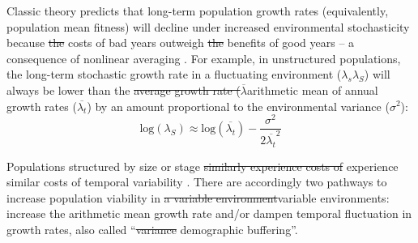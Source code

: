 \documentclass[lineno,sn-nature]{sn-jnl}%
\providecommand{\DIFadd}[1]{{\protect\color{blue}#1}} %
\providecommand{\DIFdel}[1]{{\protect\color{red}\protect\scriptsize\sout{#1}}}
\providecommand{\DIFadd}[1]{{\protect\color{blue}\uwave{#1}}} %
\providecommand{\DIFdel}[1]{{\protect\color{red}\sout{#1}}}                      %
\providecommand{\DIFaddbegin}{} %
\providecommand{\DIFaddend}{} %
\providecommand{\DIFdelbegin}{} %
\providecommand{\DIFdelend}{} %
\newcommand{\DIFscaledelfig}{0.5}
\newlength{\DIFdelgraphicswidth} %
\newlength{\DIFdelgraphicsheight} %
\newcommand{\DIFaddincludegraphics}[2][]{{\color{blue}\fbox{\DIFOincludegraphics[#1]{#2}}}} %
\newcommand{\DIFdelincludegraphics}[2][]{%
\sbox{\DIFdelgraphicsbox}{\DIFOincludegraphics[#1]{#2}}%
\settoboxwidth{\DIFdelgraphicswidth}{\DIFdelgraphicsbox} %
\settoboxtotalheight{\DIFdelgraphicsheight}{\DIFdelgraphicsbox} %
\scalebox{\DIFscaledelfig}{%
\parbox[b]{\DIFdelgraphicswidth}{\usebox{\DIFdelgraphicsbox}\\[-\baselineskip] \rule{\DIFdelgraphicswidth}{0em}}\llap{\resizebox{\DIFdelgraphicswidth}{\DIFdelgraphicsheight}{%
\setlength{\unitlength}{\DIFdelgraphicswidth}%
\begin{picture}(1,1)%
\thicklines\linethickness{2pt} %
{\color[rgb]{1,0,0}\put(0,0){\framebox(1,1){}}}%
{\color[rgb]{1,0,0}\put(0,0){\line( 1,1){1}}}%
{\color[rgb]{1,0,0}\put(0,1){\line(1,-1){1}}}%
\end{picture}%
}\hspace*{3pt}}} %
} %
\DeclareRobustCommand{\DIFaddbegin}{\DIFOaddbegin \let\includegraphics\DIFaddincludegraphics} %
\DeclareRobustCommand{\DIFaddend}{\DIFOaddend \let\includegraphics\DIFOincludegraphics} %
\DeclareRobustCommand{\DIFdelbegin}{\DIFOdelbegin \let\includegraphics\DIFdelincludegraphics} %
\DeclareRobustCommand{\DIFdelend}{\DIFOaddend \let\includegraphics\DIFOincludegraphics} %
\begin{document}
Classic theory predicts that long-term population growth rates (equivalently, population mean fitness) will decline under increased environmental stochasticity because \DIFdelbegin \DIFdel{the }\DIFdelend costs of bad years outweigh \DIFdelbegin \DIFdel{the }\DIFdelend benefits of good years -- a consequence of nonlinear averaging \cite{lewontin_population_1969,tuljapurkar_population_1982}.
For example, in unstructured populations, the long-term stochastic growth rate in a fluctuating environment (\DIFdelbegin \DIFdel{$\lambda_s$}\DIFdelend \DIFaddbegin \DIFadd{$\lambda_S$}\DIFaddend ) will always be lower than the \DIFdelbegin \DIFdel{average growth rate ($\overline{\lambda}$}\DIFdelend \DIFaddbegin \DIFadd{arithmetic mean of annual growth rates ($\overline{\lambda_{t}}$}\DIFaddend ) by an amount proportional to the environmental variance ($\sigma^2$): 
\DIFdelbegin %
\DIFdelend \DIFaddbegin \begin{equation}
\mbox{log}(\lambda_S)  \approx \mbox{log}(\overline{\lambda_{t}}) - \frac{\sigma^2}{2\overline{\lambda_{t}}^2}
\end{equation}

\DIFaddend 

\noindent Populations structured by size or stage \DIFdelbegin \DIFdel{similarly experience costs of }\DIFdelend \DIFaddbegin \DIFadd{experience similar costs of temporal }\DIFaddend variability \cite{cohen1979comparative, tuljapurkar2013population}.
There are accordingly two pathways to increase population viability in \DIFdelbegin \DIFdel{a variable environment}\DIFdelend \DIFaddbegin \DIFadd{variable environments}\DIFaddend : increase the \DIFaddbegin \DIFadd{arithmetic }\DIFaddend mean growth rate and/or dampen temporal fluctuation in growth rates, also called ``\DIFdelbegin \DIFdel{variance }\DIFdelend \DIFaddbegin \DIFadd{demographic }\DIFaddend buffering''.
\end{document}
